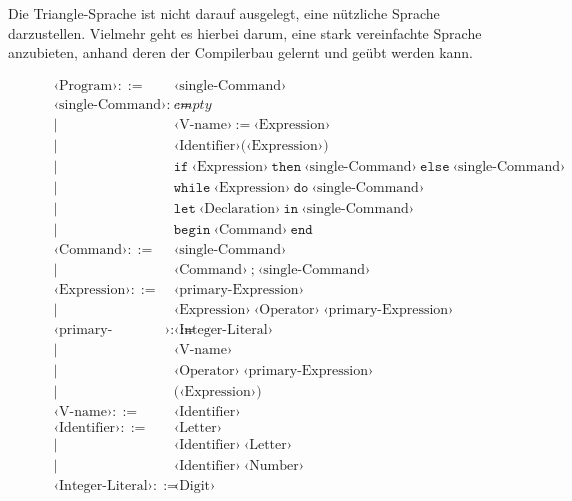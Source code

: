 \documentclass[
  ngerman,
  DIV=12
]{scrartcl}
\begin{document}
\begin{anmerkung}
Die Triangle-Sprache ist nicht darauf ausgelegt, eine nützliche Sprache darzustellen. Vielmehr geht es hierbei darum, eine stark vereinfachte Sprache anzubieten, anhand deren der Compilerbau gelernt und geübt werden kann.   
\end{anmerkung}

\begin{figure}
\begin{align*}
‹\textrm{Program}› ::=&\ ‹\textrm{single-Command}›\\
‹\textrm{single-Command}› ::=&\ empty\\
  |&\ ‹\textrm{V-name}›\ \texttt{:=}\ ‹\textrm{Expression}›\\
  |&\ ‹\textrm{Identifier}› \texttt{(} ‹\textrm{Expression}› \texttt{)}\\
  |&\ \texttt{if}\ ‹\textrm{Expression}›\ \texttt{then}\ ‹\textrm{single-Command}›\ \texttt{else}\ ‹\textrm{single-Command}›\\
  |&\ \texttt{while}\ ‹\textrm{Expression}›\ \texttt{do}\ ‹\textrm{single-Command}›\\
  |&\ \texttt{let}\ ‹\textrm{Declaration}›\ \texttt{in}\ ‹\textrm{single-Command}›\\
  |&\ \texttt{begin}\ ‹\textrm{Command}›\ \texttt{end}\\
‹\textrm{Command}› ::=&\ ‹\textrm{single-Command}›\\
  |&\ ‹\textrm{Command}›\ \texttt{;}\ ‹\textrm{single-Command}›\\
‹\textrm{Expression}› ::=&\ ‹\textrm{primary-Expression}›\\
  |&\ ‹\textrm{Expression}›\ ‹\textrm{Operator}›\ ‹\textrm{primary-Expression}›\\
‹\textrm{primary-Expression}› ::=&\ ‹\textrm{Integer-Literal}›\\
  |&\ ‹\textrm{V-name}›\\
  |&\ ‹\textrm{Operator}›\ ‹\textrm{primary-Expression}›\\
  |&\ \texttt{(} ‹\textrm{Expression}› \texttt{)}\\
‹\textrm{V-name}› ::=&\ ‹\textrm{Identifier}›\\
‹\textrm{Identifier}› ::=&\ ‹\textrm{Letter}›\\
  |&\ ‹\textrm{Identifier}›\ ‹\textrm{Letter}›\\
  |&\ ‹\textrm{Identifier}›\ ‹\textrm{Number}›\\
‹\textrm{Integer-Literal}› ::=&\ ‹\textrm{Digit}›\\

\end{align*}
\end{figure}
\end{document}
